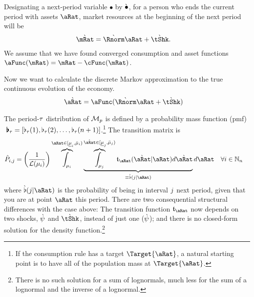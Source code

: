 \documentclass[\econtexRoot/BufferStockTheory.tex]{subfiles}
\begin{document}
Designating a next-period variable $\bullet$ by $\grave{\bullet}$, for a person who ends the current period with assets $\pnt$, market resources at the beginning of the next period will be
\begin{align}
  \Nxt{\mRat} & = \Nxt{\Rnorm}\pnt+\Nxt{\tShk}.
\end{align}
We assume that we have found converged consumption and asset functions $\aFunc(\mRat)=\mRat-\cFunc(\mRat)$.  

Now we want to calculate the discrete Markov approximation to the true continuous evolution of the economy. 
\begin{align}
  \Nxt{\pnt} & = \aFunc(\Nxt{\Rnorm} \pnt + \Nxt{\tShk})
\end{align}


The period-$\tau$ distribution of $\mathcal{M}_{p}$ is defined by a probability mass function (pmf)$~\pmb{\flat}_{\tau} = [\flat_{\tau}(1),\flat_{\tau}(2),\dots,\flat_{\tau}(n+1)]$.\footnote{If the consumption rule has a target $\Target{\aRat}$, a natural starting point is to have all of the population mass at $\Target{\aRat}$.}  The transition matrix is 
\begin{align}
  \TnsMrkv_{\thisBin,\thatBin} &= \left(\frac{1}{\Lebes(\SetPartCnts_{\thisBin})}\right)\overbrace{\int_{\SetPartCnts_{\thisBin}}}^{\pnt\in[\Bot{\SetPartCnts}_{\thisBin},\Top{\SetPartCnts}_{\thisBin})}\underbrace{\overbrace{\int_{\SetPartCnts_{\thatBin}}}^{\Nxt{\pnt}\in[\Bot{\SetPartCnts}_{\thatBin},\Top{\SetPartCnts}_{\thatBin})}\DnsPntNxtFmPntNow_{\pnt}(\Nxt{\pnt}|\pnt){d\Nxt{\pnt}}}_{\equiv \Nxt{\PrbBinNxtFmPntNow}(\thatBin|\pnt)} {d\pnt}~~~\forall\thisBin\in\Nteger_{\NumAprxStes} \label{eq:thispTOthatp}
\end{align}
where $\Nxt{\PrbBinNxtFmPntNow}(\thatBin|\pnt)$ is the probability of being in interval $j$ next period, given that you are at point $\pnt$ this period.
There are two consequential structural differences with the case above: The transition function $\DnsPntNxtFmPntNow_{\pnt}$ now depends on two shocks, $\grave{\psi}$ and $\Nxt{\tShk}$, instead of just one ($\grave{\psi}$); and there is no closed-form solution for the density function.\footnote{There is no such solution for a sum of lognormals, much less for the sum of a lognormal and the inverse of a lognormal.}
\end{document}
